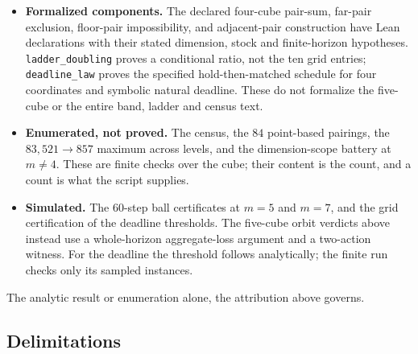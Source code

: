 \documentclass[10pt,twocolumn]{article}
\theoremstyle{plain}
\theoremstyle{definition}
\theoremstyle{remark}
\begin{document}
\begin{itemize}
\item \textbf{Formalized components.} The declared four-cube
pair-sum, far-pair exclusion, floor-pair impossibility, and adjacent-pair
construction have Lean declarations with their stated dimension, stock
and finite-horizon hypotheses. \texttt{ladder\_doubling} proves a
conditional ratio, not the ten grid entries; \texttt{deadline\_law}
proves the specified hold-then-matched schedule for four coordinates
and symbolic natural deadline. These do not formalize the five-cube or
the entire band, ladder and census text.

\item \textbf{Enumerated, not proved.} The census, the \(84\)
point-based pairings, the \(83{,}521 \to 857\) maximum across levels, and the
dimension-scope battery at \(m \ne 4\). These are finite checks over
the cube; their content is the count, and a count is what the script
supplies.

\item \textbf{Simulated.} The \(60\)-step ball certificates at
\(m = 5\) and \(m = 7\), and the grid certification of the deadline
thresholds. The five-cube orbit verdicts above instead use a
whole-horizon aggregate-loss argument and a two-action witness. For the deadline the threshold follows analytically; the finite run checks
only its sampled instances.
\end{itemize}

\noindent The analytic result
or enumeration alone, the attribution above governs.

\subsection{Delimitations}\label{scale-scope}
\end{document}
